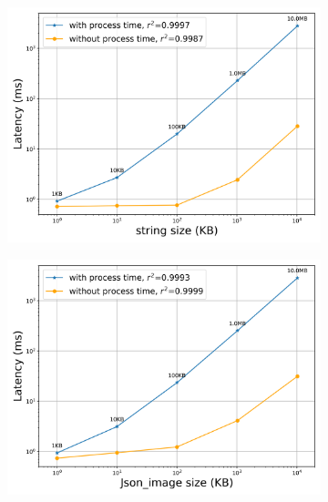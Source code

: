 \begin{figure}[htb]
    \begin{subfigure}{0.49\textwidth}
        \centering
        \includegraphics[width=\textwidth]{figures/tests/proportional_tests/log_Average_string_messages_sending_time_of_100_tests_1KB_to_10MB.png}
        \caption{} \label{fig: proportional-stringsize-c}
    \end{subfigure}
    \begin{subfigure}{0.49\textwidth}
        \centering
        \includegraphics[width=\textwidth]{figures/tests/proportional_tests/log_Average_string_messages_receiving_time_of_100_tests_1KB_to_10MB.png}
        \caption{} \label{fig: proportional-stringsize-d}
    \end{subfigure}


\end{figure}
